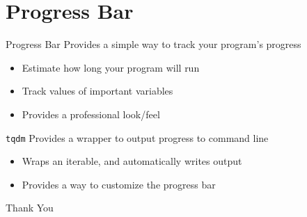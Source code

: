 \documentclass[12pt,t]{beamer}
\begin{document}
\section{Progress Bar}

\begin{frame}{Progress Bar}
	Provides a simple way to track your program's progress
	\begin{itemize}
		\item Estimate how long your program will run
		\item Track values of important variables
		\item Provides a professional look/feel
	\end{itemize}
\end{frame}

\begin{frame}{\texttt{tqdm}}
	Provides a wrapper to output progress to command line
	\begin{itemize}
		\item Wraps an iterable, and automatically writes output
		\item Provides a way to customize the progress bar
	\end{itemize}
\end{frame}

\begin{frame}[fragile, c]  %
	\begin{center}
		\Large{Thank You}
	\end{center}
\end{frame}
\end{document}

